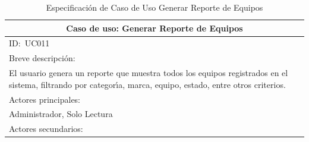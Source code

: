 \documentclass[stu, 12pt, letterpaper, donotrepeattitle, floatsintext, natbib]{apa7}
\begin{document}
\begin{longtable}{@{} p{16.5cm} @{}}
    \caption{Especificaci\'on de Caso de Uso Generar Reporte de Equipos}\label{tab:UC011}                                                                                                                                                                                        \\ \toprule
    \multicolumn{1}{c}{Caso de uso: Generar Reporte de Equipos}                                                                                                                                                                                                                  \\ \midrule
    ID:~UC011                                                                                                                                                                                                                                                                    \\ \midrule
    Breve descripci\'on:                                                                                                                                                                                                                                                         \\
    El usuario genera un reporte que muestra todos los equipos registrados en el sistema, filtrando por categor\'{\i}a, marca, equipo, estado, entre otros criterios.                                                                                                            \\ \midrule
    Actores principales:                                                                                                                                                                                                                                                         \\
    Administrador, Solo Lectura                                                                                                                                                                                                                                                  \\ \midrule
    Actores secundarios:                                                                                                                                                                                                                                                         \\

\end{longtable}
\end{document}
